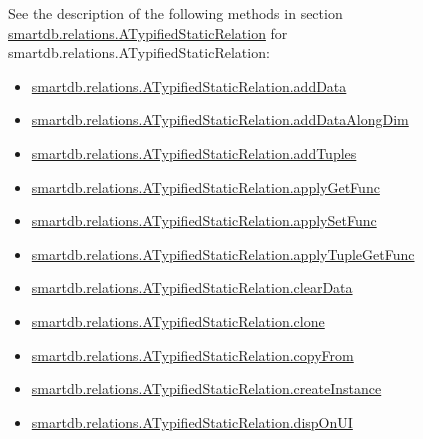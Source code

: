 \documentclass[letterpaper,10pt,english]{sphinxmanual}
\begin{document}
See the description of the following methods in section
{\hyperref[chap_func:smartdb-relations-atypifiedstaticrelation]{smartdb.relations.ATypifiedStaticRelation}} for
smartdb.relations.ATypifiedStaticRelation:
\begin{itemize}
\item {} 
{\hyperref[chap_func:smartdb-relations-atypifiedstaticrelation-adddata]{smartdb.relations.ATypifiedStaticRelation.addData}}

\item {} 
{\hyperref[chap_func:smartdb-relations-atypifiedstaticrelation-adddataalongdim]{smartdb.relations.ATypifiedStaticRelation.addDataAlongDim}}

\item {} 
{\hyperref[chap_func:smartdb-relations-atypifiedstaticrelation-addtuples]{smartdb.relations.ATypifiedStaticRelation.addTuples}}

\item {} 
{\hyperref[chap_func:smartdb-relations-atypifiedstaticrelation-applygetfunc]{smartdb.relations.ATypifiedStaticRelation.applyGetFunc}}

\item {} 
{\hyperref[chap_func:smartdb-relations-atypifiedstaticrelation-applysetfunc]{smartdb.relations.ATypifiedStaticRelation.applySetFunc}}

\item {} 
{\hyperref[chap_func:smartdb-relations-atypifiedstaticrelation-applytuplegetfunc]{smartdb.relations.ATypifiedStaticRelation.applyTupleGetFunc}}

\item {} 
{\hyperref[chap_func:smartdb-relations-atypifiedstaticrelation-cleardata]{smartdb.relations.ATypifiedStaticRelation.clearData}}

\item {} 
{\hyperref[chap_func:smartdb-relations-atypifiedstaticrelation-clone]{smartdb.relations.ATypifiedStaticRelation.clone}}

\item {} 
{\hyperref[chap_func:smartdb-relations-atypifiedstaticrelation-copyfrom]{smartdb.relations.ATypifiedStaticRelation.copyFrom}}

\item {} 
{\hyperref[chap_func:smartdb-relations-atypifiedstaticrelation-createinstance]{smartdb.relations.ATypifiedStaticRelation.createInstance}}

\item {} 
{\hyperref[chap_func:smartdb-relations-atypifiedstaticrelation-disponui]{smartdb.relations.ATypifiedStaticRelation.dispOnUI}}


\end{itemize}
\end{document}
